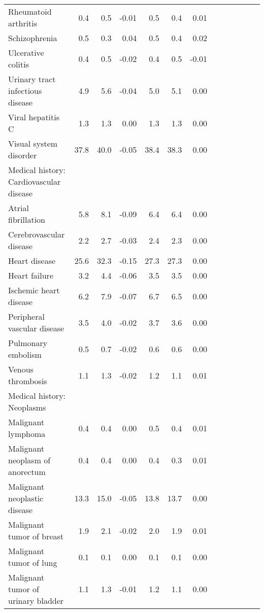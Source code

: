 \documentclass[11pt,]{article}
\begin{document}
\begin{longtable}{lrrrrrrrrrrrr}
      Rheumatoid arthritis &  0.4 &   0.5 & -0.01 &  0.5 &   0.4 &  0.01 \\ 
      Schizophrenia &  0.5 &   0.3 &  0.04 &  0.5 &   0.4 &  0.02 \\ 
      Ulcerative colitis &  0.4 &   0.5 & -0.02 &  0.4 &   0.5 & -0.01 \\ 
      Urinary tract infectious disease &  4.9 &   5.6 & -0.04 &  5.0 &   5.1 &  0.00 \\ 
      Viral hepatitis C &  1.3 &   1.3 &  0.00 &  1.3 &   1.3 &  0.00 \\ 
      Visual system disorder & 37.8 &  40.0 & -0.05 & 38.4 &  38.3 &  0.00 \\ 
  Medical history: Cardiovascular disease &    &     &     &    &     &     \\ 
      Atrial fibrillation &  5.8 &   8.1 & -0.09 &  6.4 &   6.4 &  0.00 \\ 
      Cerebrovascular disease &  2.2 &   2.7 & -0.03 &  2.4 &   2.3 &  0.00 \\ 
      Heart disease & 25.6 &  32.3 & -0.15 & 27.3 &  27.3 &  0.00 \\ 
      Heart failure &  3.2 &   4.4 & -0.06 &  3.5 &   3.5 &  0.00 \\ 
      Ischemic heart disease &  6.2 &   7.9 & -0.07 &  6.7 &   6.5 &  0.00 \\ 
      Peripheral vascular disease &  3.5 &   4.0 & -0.02 &  3.7 &   3.6 &  0.00 \\ 
      Pulmonary embolism &  0.5 &   0.7 & -0.02 &  0.6 &   0.6 &  0.00 \\ 
      Venous thrombosis &  1.1 &   1.3 & -0.02 &  1.2 &   1.1 &  0.01 \\ 
  Medical history: Neoplasms &    &     &     &    &     &     \\ 
      Malignant lymphoma &  0.4 &   0.4 &  0.00 &  0.5 &   0.4 &  0.01 \\ 
      Malignant neoplasm of anorectum &  0.4 &   0.4 &  0.00 &  0.4 &   0.3 &  0.01 \\ 
      Malignant neoplastic disease & 13.3 &  15.0 & -0.05 & 13.8 &  13.7 &  0.00 \\ 
      Malignant tumor of breast &  1.9 &   2.1 & -0.02 &  2.0 &   1.9 &  0.01 \\ 
      Malignant tumor of lung &  0.1 &   0.1 &  0.00 &  0.1 &   0.1 &  0.00 \\ 
      Malignant tumor of urinary bladder &  1.1 &   1.3 & -0.01 &  1.2 &   1.1 &  0.00 \\ 

\end{longtable}
\end{document}
